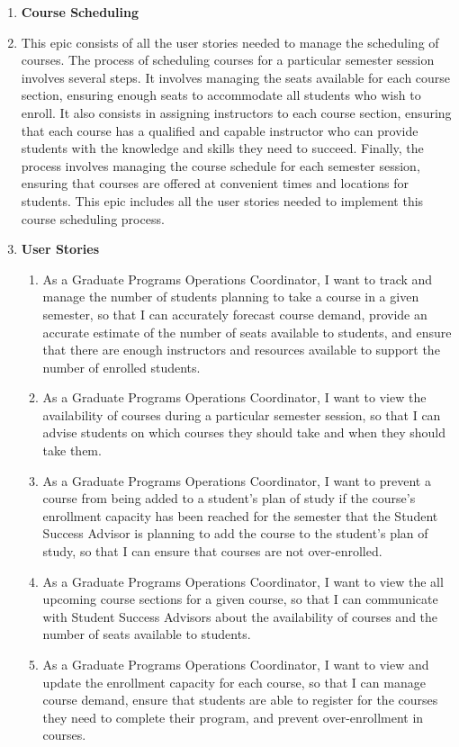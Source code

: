 \documentclass[12pt]{article}
\begin{document}
\begin{appendices}
\begin{enumerate}[label=(\roman*)]
        \item \textbf{Course Scheduling}
        \item[] This epic consists of all the user stories needed to manage the scheduling of courses. The process of scheduling courses for a particular semester session involves several steps. It involves managing the seats available for each course section, ensuring enough seats to accommodate all students who wish to enroll. It also consists in assigning instructors to each course section, ensuring that each course has a qualified and capable instructor who can provide students with the knowledge and skills they need to succeed. Finally, the process involves managing the course schedule for each semester session, ensuring that courses are offered at convenient times and locations for students. This epic includes all the user stories needed to implement this course scheduling process.
        \item[] \textbf{User Stories}
        \begin{enumerate}
            \item As a Graduate Programs Operations Coordinator, I want to track and manage the number of students planning to take a course in a given semester, so that I can accurately forecast course demand, provide an accurate estimate of the number of seats available to students, and ensure that there are enough instructors and resources available to support the number of enrolled students.
            \item As a Graduate Programs Operations Coordinator, I want to view the availability of courses during a particular semester session, so that I can advise students on which courses they should take and when they should take them.
            \item As a Graduate Programs Operations Coordinator, I want to prevent a course from being added to a student's plan of study if the course's enrollment capacity has been reached for the semester that the Student Success Advisor is planning to add the course to the student's plan of study, so that I can ensure that courses are not over-enrolled.
            \item As a Graduate Programs Operations Coordinator, I want to view the all upcoming course sections for a given course, so that I can communicate with Student Success Advisors about the availability of courses and the number of seats available to students.
            \item As a Graduate Programs Operations Coordinator, I want to view and update the enrollment capacity for each course, so that I can manage course demand, ensure that students are able to register for the courses they need to complete their program, and prevent over-enrollment in courses.

\end{enumerate}
\end{enumerate}
\end{appendices}
\end{document}
